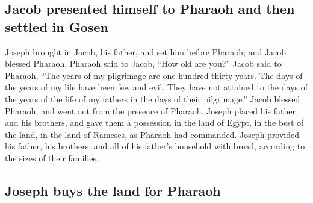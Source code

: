 \begin{paracol}{2}
\begin{otherlanguage}{english}
\hypertarget{jacob-presented-himself-to-pharaoh-and-then-settled-in-gosen}{%
\subsection{Jacob presented himself to Pharaoh and then settled in
Gosen}\label{jacob-presented-himself-to-pharaoh-and-then-settled-in-gosen}}

 Joseph brought in Jacob, his father, and set him before
Pharaoh; and Jacob blessed Pharaoh.  Pharaoh said to
Jacob, ``How old are you?''  Jacob said to Pharaoh, ``The
years of my pilgrimage are one hundred thirty years. The days of the
years of my life have been few and evil. They have not attained to the
days of the years of the life of my fathers in the days of their
pilgrimage.''  Jacob blessed Pharaoh, and went out from
the presence of Pharaoh.  Joseph placed his father and
his brothers, and gave them a possession in the land of Egypt, in the
best of the land, in the land of Rameses, as Pharaoh had commanded.
 Joseph provided his father, his brothers, and all of his
father's household with bread, according to the sizes of their families.

\hypertarget{joseph-buys-the-land-for-pharaoh}{%
\subsection{Joseph buys the land for
Pharaoh}\label{joseph-buys-the-land-for-pharaoh}}


\end{otherlanguage}
\end{paracol}
